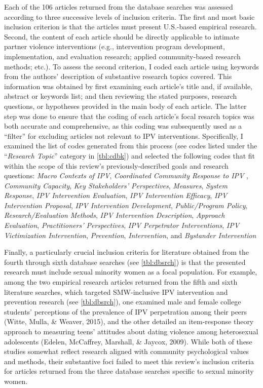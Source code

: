 \documentclass[11pt,]{tufte-book}
\begin{document}
Each of the 106 articles returned from the database searches was
assessed according to three successive levels of inclusion criteria. The
first and most basic inclusion criterion is that the articles must
present U.S.-based empirical research. Second, the content of each
article should be directly applicable to intimate partner violence
interventions (e.g., intervention program development, implementation,
and evaluation research; applied community-based research methods;
etc.). To assess the second criterion, I coded each article using
keywords from the authors' description of substantive research topics
covered. This information was obtained by first examining each article's
title and, if available, abstract or keywords list; and then reviewing
the stated purposes, research questions, or hypotheses provided in the
main body of each article. The latter step was done to ensure that the
coding of each article's focal resarch topics was both accurate and
comprehensive, as this coding was subsequently used as a ``filter'' for
excluding articles not relevant to IPV interventions. Specifically, I
examined the list of codes generated from this process (see codes listed
under the ``\emph{Research Topic}'' category in
\cref{tbl:cdbk}) and selected the following codes that
fit within the scope of this review's previously-described goals and
research questions: \emph{Macro Contexts of IPV}, \emph{Coordinated
Community Response to IPV }, \emph{Community Capacity}, \emph{Key
Stakeholders' Perspectives}, \emph{Measures}, \emph{System Response},
\emph{IPV Intervention Evaluation}, \emph{IPV Intervention Efficacy},
\emph{IPV Intervention Proposal}, \emph{IPV Intervention Development},
\emph{Public/Program Policy}, \emph{Research/Evaluation Methods},
\emph{IPV Intervention Description}, \emph{Approach Evaluation},
\emph{Practitioners' Perspectives}, \emph{IPV Perpetrator
Interventions}, \emph{IPV Victimization Intervention},
\emph{Prevention}, \emph{Intervention}, and \emph{Bystander
Intervention}

Finally, a particularly crucial inclusion criteria for literature
obtained from the fourth through sixth database searches (see
\cref{tbl:dbsrch}) is that the presented research must
include sexual minority women as a focal population. For example, among
the two empirical research articles returned from the fifth and sixth
literature searches, which targeted SMW-inclusive IPV intervention and
prevention research (see \cref{tbl:dbsrch}), one
examined male and female college students' perceptions of the prevalence
of IPV perpetration among their peers (Witte, Mulla, \& Weaver, 2015),
and the other detailed an item-response theory approach to measuring
teens' attitudes about dating violence among heterosexual adolescents
(Edelen, McCaffrey, Marshall, \& Jaycox, 2009). While both of these
studies somewhat reflect research aligned with community psychological
values and methods, their substantive foci failed to meet this review's
inclusion criteria for articles returned from the three database
searches specific to sexual minority women.
\end{document}
